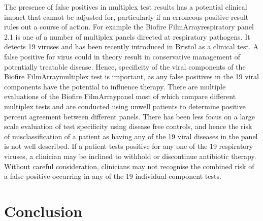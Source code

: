 \documentclass[10pt,letterpaper]{article}
\begin{document}
The presence of false positives in multiplex test results has a potential clinical impact that cannot be adjusted for, particularly if an erroneous positive result rules out a course of action. For example the Biofire FilmArray\texttrademark respiratory panel 2.1 is one of a number of multiplex panels directed at respiratory pathogens\cite{ramanan2017}. It detects 19 viruses\cite{chang2022,loeffelholz2020} and has been recently introduced in Bristol as a clinical test. A false positive for virus could in theory result in conservative management of potentially treatable disease. Hence, specificity of the viral components of the Biofire FilmArray\texttrademark multiplex test is important, as any false positives in the 19 viral components have the potential to influence therapy. There are multiple evaluations of the Biofire FilmArray\texttrademark panel\cite{popowitch2020,murphy2020,loeffelholz2020,leber2018,babady2013,chan2018} most of which compare different multiplex tests and are conducted using unwell patients to determine positive percent agreement between different panels. There has been less focus on a large scale evaluation of test specificity using disease free controls, and hence the risk of misclassification of a patient as having any of the 19 viral diseases in the panel is not well described. If a patient tests positive for any one of the 19 respiratory viruses, a clinician may be inclined to withhold or discontinue antibiotic therapy. Without careful consideration, clinicians may not recognise the combined risk of a false positive occurring in any of the 19 individual component tests.

\section*{Conclusion}
\end{document}
